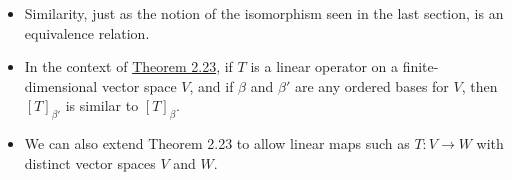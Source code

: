 \begin{itemize}
    \item Similarity, just as the notion of the isomorphism seen in the last section, is an equivalence relation. 
    \item  In the context of {\hyperref[Theorem 2.23]{Theorem 2.23}}, if \( T  \) is a linear operator on a finite-dimensional vector space \( V  \), and if \( \beta \) and \( \beta'  \) are any ordered bases for \( V  \), then \( [T]_{\beta'} \) is similar to \( [T]_{\beta} \).
    \item We can also extend Theorem 2.23 to allow linear maps such as \( T: V \to W   \) with distinct vector spaces  \( V  \) and \( W  \).
\end{itemize}
